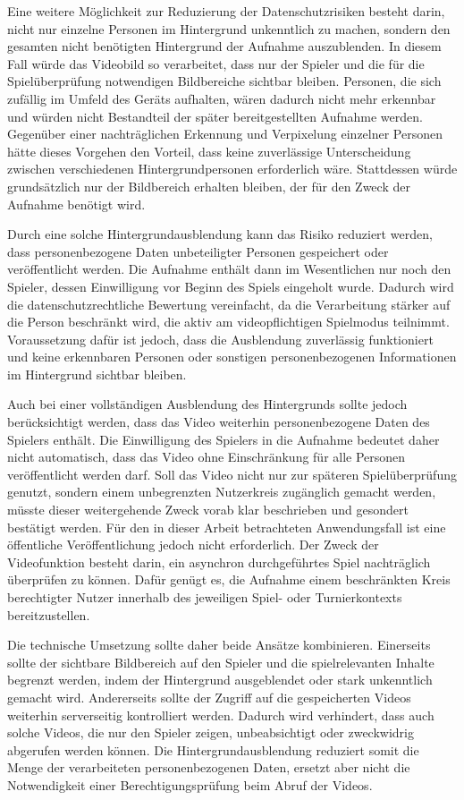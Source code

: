 Eine weitere Möglichkeit zur Reduzierung der Datenschutzrisiken besteht darin, nicht nur einzelne Personen im Hintergrund unkenntlich zu machen, sondern den gesamten nicht benötigten Hintergrund der Aufnahme auszublenden. In diesem Fall würde das Videobild so verarbeitet, 
dass nur der Spieler und die für die Spielüberprüfung notwendigen Bildbereiche sichtbar bleiben. Personen, die sich zufällig im Umfeld des Geräts aufhalten, wären dadurch nicht mehr erkennbar und würden nicht Bestandteil der später bereitgestellten Aufnahme werden. 
Gegenüber einer nachträglichen Erkennung und Verpixelung einzelner Personen hätte dieses Vorgehen den Vorteil, dass keine zuverlässige Unterscheidung zwischen verschiedenen Hintergrundpersonen erforderlich wäre. Stattdessen würde grundsätzlich nur der Bildbereich erhalten bleiben, 
der für den Zweck der Aufnahme benötigt wird. 

Durch eine solche Hintergrundausblendung kann das Risiko reduziert werden, dass personenbezogene Daten unbeteiligter Personen gespeichert oder veröffentlicht werden. Die Aufnahme enthält dann im Wesentlichen nur noch den Spieler, dessen Einwilligung vor Beginn des Spiels eingeholt wurde. 
Dadurch wird die datenschutzrechtliche Bewertung vereinfacht, da die Verarbeitung stärker auf die Person beschränkt wird, die aktiv am videopflichtigen Spielmodus teilnimmt. Voraussetzung dafür ist jedoch, 
dass die Ausblendung zuverlässig funktioniert und keine erkennbaren Personen oder sonstigen personenbezogenen Informationen im Hintergrund sichtbar bleiben. 

Auch bei einer vollständigen Ausblendung des Hintergrunds sollte jedoch berücksichtigt werden, dass das Video weiterhin personenbezogene Daten des Spielers enthält. Die Einwilligung des Spielers in die Aufnahme bedeutet daher nicht automatisch, 
dass das Video ohne Einschränkung für alle Personen veröffentlicht werden darf. Soll das Video nicht nur zur späteren Spielüberprüfung genutzt, sondern einem unbegrenzten Nutzerkreis zugänglich gemacht werden, müsste dieser weitergehende Zweck vorab klar beschrieben und gesondert bestätigt werden. 
Für den in dieser Arbeit betrachteten Anwendungsfall ist eine öffentliche Veröffentlichung jedoch nicht erforderlich. Der Zweck der Videofunktion besteht darin, ein asynchron durchgeführtes Spiel nachträglich überprüfen zu können. Dafür genügt es, 
die Aufnahme einem beschränkten Kreis berechtigter Nutzer innerhalb des jeweiligen Spiel- oder Turnierkontexts bereitzustellen. 

Die technische Umsetzung sollte daher beide Ansätze kombinieren. Einerseits sollte der sichtbare Bildbereich auf den Spieler und die spielrelevanten Inhalte begrenzt werden, indem der Hintergrund ausgeblendet oder stark unkenntlich gemacht wird. 
Andererseits sollte der Zugriff auf die gespeicherten Videos weiterhin serverseitig kontrolliert werden. Dadurch wird verhindert, dass auch solche Videos, die nur den Spieler zeigen, unbeabsichtigt oder zweckwidrig abgerufen werden können. 
Die Hintergrundausblendung reduziert somit die Menge der verarbeiteten personenbezogenen Daten, ersetzt aber nicht die Notwendigkeit einer Berechtigungsprüfung beim Abruf der Videos.

